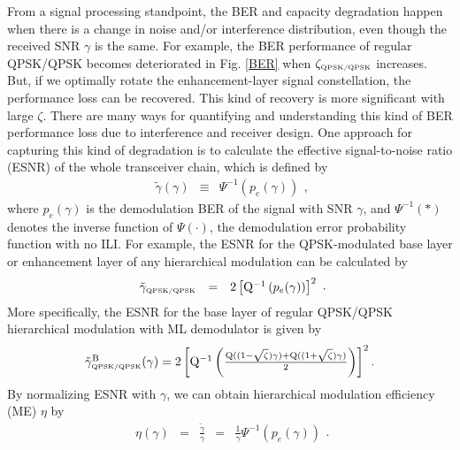 \documentclass[conference]{IEEEtran}
\begin{document}
From a signal processing standpoint, the BER and capacity
degradation happen when there is a change in noise and/or
interference distribution, even though the received SNR $\gamma$
is the same. For example, the BER performance of regular QPSK/QPSK
becomes deteriorated in Fig. \ref{BER} when $\zeta_{\mbox{\tiny
QPSK/QPSK}}$ increases. But, if we optimally rotate the
enhancement-layer signal constellation, the performance loss can
be recovered. This kind of recovery is more significant with large
$\zeta$. There are many ways for quantifying and understanding
this kind of BER performance loss due to interference and receiver
design. One approach for capturing this kind of degradation is to
calculate the effective signal-to-noise ratio (ESNR) of the whole
transceiver chain, which is defined by
\begin{equation}
\begin{array}{rcl}
\tilde{\gamma}\left(\gamma\right)&\equiv&\Psi^{-1}\left(p_{e}(\gamma)\right)
\end{array},\label{eff_SNR}
\end{equation}
\noindent where $p_{e}(\gamma)$ is the demodulation BER of the
signal with SNR $\gamma$, and $\Psi^{-1}\left(\ast\right)$ denotes
the inverse function of $\Psi\left(\cdot\right)$, the demodulation
error probability function with no ILI. For example, the ESNR for
the QPSK-modulated base layer or enhancement layer of any
hierarchical modulation can be calculated by
\begin{equation}
\begin{array}{rcl}
\tilde{\gamma}_{\mbox{\tiny QPSK/QPSK}}&=&2\left[{\rm
Q}^{-1}\left(p_{e}(\gamma)\right)\right]^2
\end{array}.\label{eff_SNR_QPSK}
\end{equation}
\noindent More specifically, the ESNR for the base layer of
regular QPSK/QPSK hierarchical modulation with ML demodulator is
given by
\begin{equation}\hspace{-0.00in}
\begin{array}{l}
\tilde{\gamma}_{\mbox{\tiny QPSK/QPSK}}^{\rm
B}(\gamma)=2\left[{\rm Q}^{-1}\left(\frac{{\rm
Q}((1-\sqrt{\zeta})\gamma)+{\rm
Q}((1+\sqrt{\zeta})\gamma)}{2}\right)\right]^2.
\end{array}\label{eff_SNR_QPSK_QPSK}
\end{equation}
\noindent By normalizing ESNR with $\gamma$, we can obtain
hierarchical modulation efficiency (ME) $\eta$ by
\begin{equation}
\begin{array}{rcccl}
\eta\left(\gamma\right)&=&\frac{\tilde{\gamma}}{\gamma}&=&\frac{1}{\gamma}\Psi^{-1}\left(p_{e}(\gamma)\right)
\end{array}.\label{mod_eff}
\end{equation}
\end{document}
